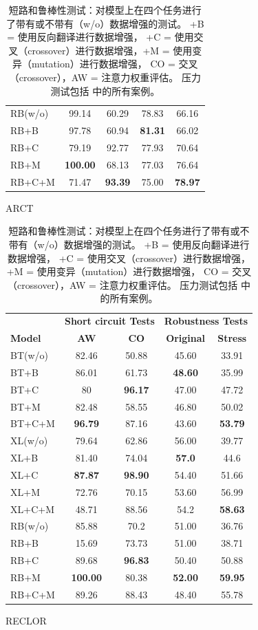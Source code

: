 \begin{table}[th!]
\begin{subtable}[t]{0.45\textwidth}
\begin{tabular}{l|cc|cc}
    \rowcolor{Gray}
    RB(w/o)&99.14&60.29&78.83&66.16\\
    RB+B&97.78&60.94&\textbf{81.31}&66.02\\
    RB+C&79.19&92.77&77.93&70.64\\
    RB+M&\textbf{100.00}&68.13&77.03&76.64\\
    RB+C+M&71.47&\textbf{93.39}&75.00&\textbf{78.97}\\
    \bottomrule
    \end{tabular}
    \caption{ARCT}
    \end{subtable} 
    \hfill
    \begin{subtable}[t]{0.45\textwidth}
    \centering
    \begin{tabular}{l|cc|cc}\toprule
        & \multicolumn{2}{c|}{\bf Short circuit Tests} & \multicolumn{2}{c}{\bf Robustness Tests} \\ \cline{2-5}
    \textbf{Model} &\textbf{AW} &\textbf{CO} & \textbf{Original} &\textbf{Stress}\\ \hline
    \rowcolor{Gray}
    BT(w/o)&82.46&50.88&45.60&33.91\\
    BT+B&86.01&61.73&\textbf{48.60}&35.99\\
    BT+C&80&\textbf{96.17}&47.00&47.72\\
    BT+M&82.48&58.55&46.80&50.02\\
    BT+C+M&\textbf{96.79}&87.16&43.60&\textbf{53.79}\\
    \midrule
                     
    \rowcolor{Gray}
    XL(w/o)&79.64&62.86&56.00&39.77\\
    XL+B&81.40&74.04&\textbf{57.0}&44.6\\
    XL+C&\textbf{87.87}&\textbf{98.90}&54.40&51.66\\
    XL+M&72.76&70.15&53.60&56.99\\
    XL+C+M&48.71&88.56&54.2&\textbf{58.63}\\
    \midrule
    \rowcolor{Gray}
    RB(w/o)&85.88&70.2&51.00&36.76\\
    RB+B&15.69&73.73&51.00&38.71\\
    RB+C&89.68&\textbf{96.83}&50.40&50.88\\
    RB+M&\textbf{100.00}&80.38&\textbf{52.00}&\textbf{59.95}\\
    RB+C+M&89.26&88.43&48.40&55.78\\
    \bottomrule
    \end{tabular}
    \caption{RECLOR}
    \end{subtable}
    \caption{\label{tab3:results} 短路和鲁棒性测试：对模型上在四个任务进行了带有或不带有（w/o）数据增强的测试。
    +B = 使用反向翻译进行数据增强，
    +C = 使用交叉（crossover）进行数据增强，+M = 使用变异（mutation）进行数据增强，
    CO = 交叉（crossover），AW = 注意力权重评估。
    压力测试包括  中的所有案例。}
    \end{table}
    
